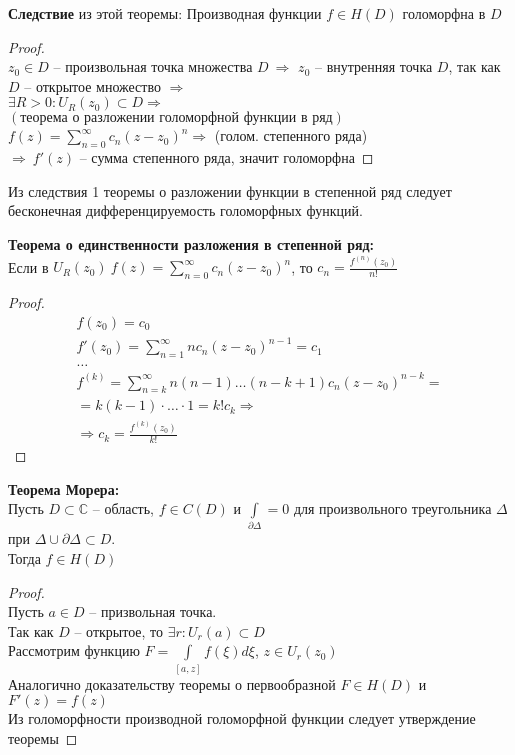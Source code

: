 \textbf{Следствие} из этой теоремы:
Производная функции $f\in H(D)$ голоморфна в $D$
\begin{proof}
    \ \\
    $z_0 \in D$ -- произвольная точка множества $D \ \Rightarrow$ $z_0$ -- внутренняя точка $D$, 
    так как $D$ -- открытое множество $\Rightarrow$ \\[2mm]
    $\exists R > 0: U_R(z_0) \subset D \Rightarrow$ \\[2mm]
    $(\text{теорема о разложении голоморфной функции в ряд})$ \\[2mm] 
    $f(z) = \sum_{n=0}^{\infty}c_n (z - z_0)^n \Rightarrow$ (голом. степенного ряда)\\[2mm]
    $\Rightarrow \ f'(z)$ -- сумма степенного ряда, значит голоморфна 
\end{proof}

Из следствия 1 теоремы о разложении функции в степенной 
ряд следует бесконечная дифференцируемость голоморфных функций.


\textbf{Теорема о единственности разложения в степенной ряд:}\\[2mm]
Если в $U_R(z_0) \ f(z) = \sum_{n=0}^{\infty}c_n (z-z_0)^n$, то $c_n = \frac{f^{(n)}(z_0)}{n!}$


\begin{proof}
	\ \\
	\begin{equation*}
	\begin{gathered}
		f(z_0) = c_0 \\
		f'(z_0) = \sum_{n=1}^{\infty}nc_n(z-z_0)^{n-1} = c_1 \\
		\dots \\
		f^{(k)} = \sum_{n=k}^{\infty} n(n-1)\dots(n-k+1)c_n(z-z_0)^{n-k} = \\ 
		= k(k-1) \cdot \dots \cdot 1 = k!c_k \Rightarrow \\ 
		\Rightarrow c_k = \frac{f^{(k)}(z_0)}{k!}
	\end{gathered}
	\end{equation*}
\end{proof}


\textbf{Теорема Морера:}\\[2mm]
Пусть $D \subset \mathbb{C}$ -- область, $f \in C(D)$ и $\int \limits_{\partial \Delta} = 0$
для произвольного треугольника $\Delta$ при $\Delta \cup \partial \Delta \subset D$. \\[2mm]
Тогда $f \in H(D)$


\begin{proof}
	\ \\
	Пусть $a \in D$ -- призвольная точка. \\[2mm]
	Так как $D$ -- открытое, то $\exists r: U_r(a) \subset D$ \\[2mm]
	Рассмотрим функцию $F = \int \limits_{[a, z]} f(\xi)d\xi$, $z \in U_r(z_0)$ \\[2mm]
	Аналогично доказательству теоремы о первообразной $F \in H(D)$ и $F'(z) = f(z)$ \\[2mm]
	Из голоморфности производной голоморфной функции следует утверждение теоремы
\end{proof}


